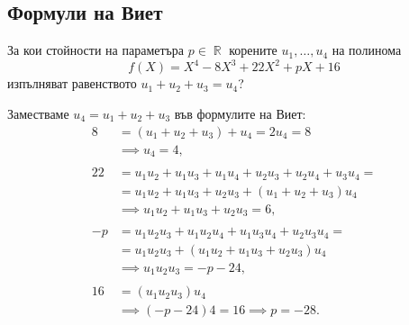 \documentclass{../../common/topic}
\begin{document}
\subsection{Формули на Виет}

\begin{exercise}
  За кои стойности на параметъра \( p \in \BbbR \) корените \( u_1, \ldots, u_4 \) на полинома
  \begin{equation*}
    f(X) = X^4 - 8X^3 + 22X^2 + pX + 16
  \end{equation*}
  изпълняват равенството \( u_1 + u_2 + u_3 = u_4 \)?
\end{exercise}
\begin{solution}
  Заместваме \( u_4 = u_1 + u_2 + u_3 \) във формулите на Виет:
  \begin{align*}
    8 &= (u_1 + u_2 + u_3) + u_4 = 2u_4 = 8
    \\&\implies
    u_4 = 4,
    \\ \\
    22 &= u_1 u_2 + u_1 u_3 + u_1 u_4 + u_2 u_3 + u_2 u_4 + u_3 u_4 = \\ &= u_1 u_2 + u_1 u_3 + u_2 u_3 + (u_1 + u_2 + u_3) u_4
    \\&\implies
    u_1 u_2 + u_1 u_3 + u_2 u_3 = 6,
    \\ \\
    -p &= u_1 u_2 u_3 + u_1 u_2 u_4 + u_1 u_3 u_4 + u_2 u_3 u_4 = \\ &= u_1 u_2 u_3 + (u_1 u_2 + u_1 u_3 + u_2 u_3) u_4 \\&\implies
    u_1 u_2 u_3 = -p - 24,
    \\ \\
    16 &= (u_1 u_2 u_3) u_4
    \\&\implies
    (-p - 24) 4 = 16 \implies p = -28.
  \end{align*}
\end{solution}

\printbibliography
\end{document}
